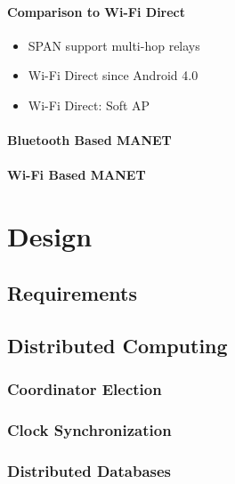 			\subsubsection*{Comparison to Wi-Fi Direct}
			
				{\color{gray} 
					\begin{itemize}  
						\item SPAN support multi-hop relays
						\item Wi-Fi Direct since Android 4.0
						\item Wi-Fi Direct: Soft AP 
					\end{itemize}
				}
		
			\subsubsection*{Bluetooth Based \gls{MANET} }

			\subsubsection*{Wi-Fi Based \gls{MANET}}
	
\chapter{Design }

	\section{Requirements}
	

	\section{Distributed Computing}

		\subsection*{Coordinator Election}
		
		\subsection*{Clock Synchronization}
		
		\subsection*{Distributed Databases}
		
